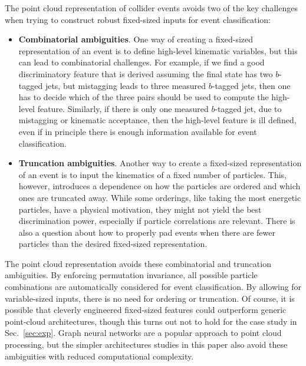 \documentclass[aps,prd,twocolumn,superscriptaddress,floatfix,longbibliography,preprintnumbers,nofootinbib]{revtex4-1} %
\DeclareRobustCommand{\Sec}[1]{Sec.~\ref{sec:#1}}
\newcommand{\neww}[1]{{{#1}}}
\begin{document}
The point cloud representation of collider events avoids two of the key challenges when trying to construct robust fixed-sized inputs for event classification:
%
  \begin{itemize}
    \item \textbf{Combinatorial ambiguities}.
    One way of creating a fixed-sized representation of an event is to define high-level kinematic variables, but this can lead to combinatorial challenges.
    For example, if we find a good discriminatory feature that is derived assuming the final state has two $b$-tagged jets, but mistagging leads to three measured $b$-tagged jets, then one has to decide which of the three pairs should be used to compute the high-level feature.
    Similarly, if there is only one measured $b$-tagged jet, due to mistagging or kinematic acceptance, then the high-level feature is ill defined, even if in principle there is enough information available for event classification.
    \item \textbf{Truncation ambiguities}.
    Another way to create a fixed-sized representation of an event is to input the kinematics of a fixed number of particles.
    This, however, introduces a dependence on how the particles are ordered and which ones are truncated away.
    While some orderings, like taking the most energetic particles, have a physical motivation, they might not yield the best discrimination power, especially if particle correlations are relevant.
    There is also a question about how to properly pad events when there are fewer particles than the desired fixed-sized representation.
  \end{itemize}

The point cloud representation avoids these combinatorial and truncation ambiguities.
%
By enforcing permutation invariance, all possible particle combinations are automatically considered for event classification.
%
By allowing for variable-sized inputs, there is no need for ordering or truncation.
%
Of course, it is possible that cleverly engineered fixed-sized features could outperform generic point-cloud architectures, though this turns out not to hold for the case study in \Sec{exp}.
%
\neww{Graph neural networks are a popular approach to point cloud processing, but the simpler architectures studies in this paper also avoid these ambiguities with reduced computational complexity.}
\end{document}
